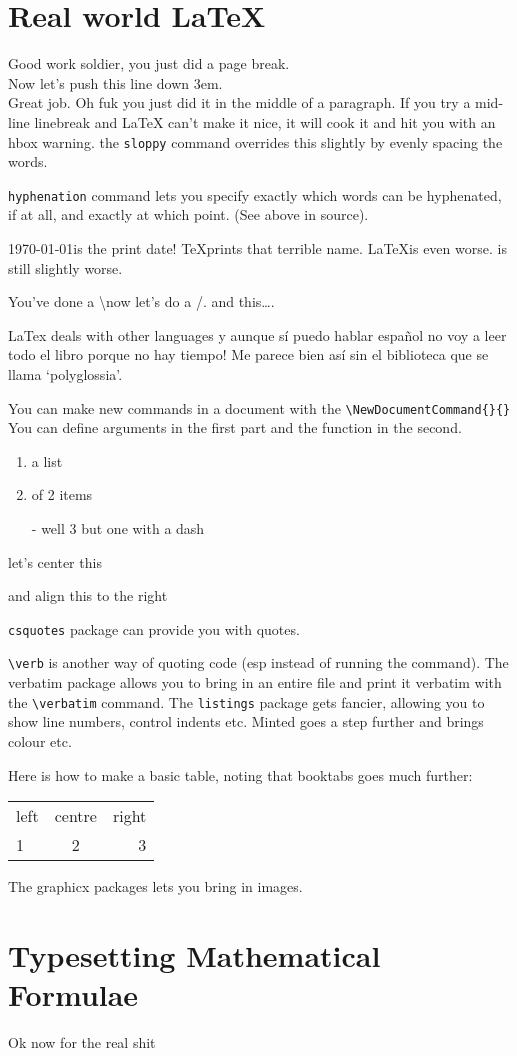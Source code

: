 \documentclass{article}
\begin{document}
\pagebreak

\section{Real world LaTeX}

Good work soldier, you just did a page break. \\[3em] Now let's push this line down 3em.\\Great job. Oh fuk you just did it in the middle of a paragraph. If you try a mid-line linebreak and LaTeX can't make it nice, it will cook it and hit you with an hbox warning. the \texttt{sloppy} command overrides this slightly by evenly spacing the words.


\texttt{hyphenation} command lets you specify exactly which words can be hyphenated, if at all, and exactly at which point. (See above in source).

\today\space is the print date! \TeX\space prints that terrible name. \LaTeX is even worse. \LaTeXe is still slightly worse.

You've done a \textbackslash\space now let's do a \slash. and this\ldots.

LaTex deals with other languages y aunque sí puedo hablar español no voy a leer todo el libro porque no hay tiempo! Me parece bien así sin el biblioteca que se llama `polyglossia'.

You can make new commands in a document with the \texttt{\textbackslash NewDocumentCommand\{\}\{\}} You can define arguments in the first part and the function in the second.

\begin{enumerate}
\item a list
\item of 2 items
\item[-] well 3 but one with a dash
\end{enumerate}

\begin{center} let's center this \end{center}
\begin{flushright} and align this to the right \end{flushright}

\texttt{csquotes} package can provide you with quotes.

\verb|\verb| is another way of quoting code (esp instead of running the command). The verbatim package allows you to bring in an entire file and print it verbatim with the \verb|\verbatim| command. The \verb|listings| package gets fancier, allowing you to show line numbers, control indents etc. Minted goes a step further and brings colour etc.

Here is how to make a basic table, noting that booktabs goes much further:

\begin{tabular}{lcr}
left & centre & right \\
1 & 2 & 3 \\
\end{tabular}

The graphicx packages lets you bring in images.

\section{Typesetting Mathematical
Formulae}

Ok now for the real shit
\end{document}
